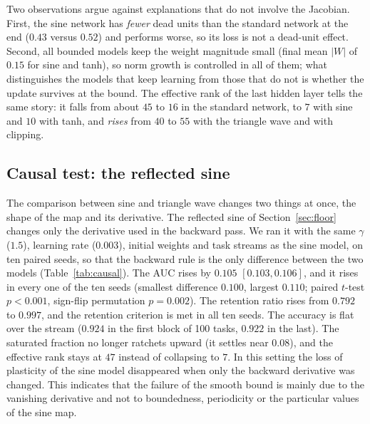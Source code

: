 \documentclass[11pt,a4paper]{article}
\begin{document}
Two observations argue against explanations that do not involve the Jacobian. First, the sine network has
\emph{fewer} dead units than the standard network at the end ($0.43$ versus $0.52$) and performs worse, so its
loss is not a dead-unit effect. Second, all bounded models keep the weight magnitude small (final mean
$|W|$ of $0.15$ for sine and tanh), so norm growth is controlled in all of them; what distinguishes the models
that keep learning from those that do not is whether the update survives at the bound. The effective rank of
the last hidden layer tells the same story: it falls from about $45$ to $16$ in the standard network, to $7$
with sine and $10$ with tanh, and \emph{rises} from $40$ to $55$ with the triangle wave and with clipping.

\subsection{Causal test: the reflected sine}\label{sec:causal}

The comparison between sine and triangle wave changes two things at once, the shape of the map and its
derivative. The reflected sine of Section~\ref{sec:floor} changes only the derivative used in the backward pass.
We ran it with the same $\gamma$ ($1.5$), learning rate ($0.003$), initial weights and task streams as the sine
model, on ten paired seeds, so that the backward rule is the only difference between the two models
(Table~\ref{tab:causal}). The AUC rises by $0.105$ $[0.103,0.106]$, and it rises in every one of the ten seeds
(smallest difference $0.100$, largest $0.110$; paired $t$-test $p<0.001$, sign-flip permutation $p=0.002$).
The retention ratio rises from $0.792$ to $0.997$, and the retention criterion is met in all ten seeds. The
accuracy is flat over the stream ($0.924$ in the first block of 100 tasks, $0.922$ in the last). The saturated
fraction no longer ratchets upward (it settles near $0.08$), and the effective rank stays at $47$ instead of
collapsing to $7$. In this setting the loss of plasticity of the sine model disappeared when only the backward
derivative was changed. This indicates that the failure of the smooth bound is mainly due to the vanishing
derivative and not to boundedness, periodicity or the particular values of the sine map.
\end{document}
